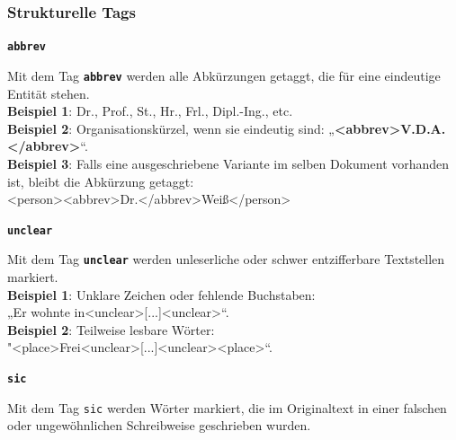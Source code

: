 \documentclass[12pt, a4paper, ngerman, bidi=default]{article}
\begin{document}
    \subsubsection{Strukturelle Tags}
    \begin{description}

    \item \textbf{\colorbox{abbrev}{\texttt{abbrev}}}
        
    Mit dem Tag \texttt{\texttt{\textbf{{\colorbox{abbrev}{abbrev}}}}} werden alle Abkürzungen getaggt, die für eine eindeutige Entität stehen. \\
    
    \noindent\textbf{ Beispiel 1}: Dr., Prof., St., Hr., Frl., Dipl.-Ing., etc.\\
    \textbf{ Beispiel 2}: Organisationskürzel, wenn sie eindeutig sind: „\textbf{\textless abbrev\textgreater V.D.A.\textless /abbrev\textgreater }“.\\
    \textbf{\textbf{ Beispiel 3}}: Falls eine ausgeschriebene Variante im selben Dokument vorhanden ist, bleibt die Abkürzung getaggt:\\
    \colorbox{VeryLightGray}{\textless person\textgreater \textless abbrev\textgreater Dr.\textless /abbrev\textgreater Weiß\textless /person\textgreater}

    
    \item \textbf{\colorbox{unclear}{\texttt{unclear}}}
    

    Mit dem Tag \texttt{\texttt{\textbf{{\colorbox{unclear}{unclear}}}}} werden unleserliche oder schwer entzifferbare Textstellen markiert. \\
    
    \noindent\textbf{ Beispiel 1}: Unklare Zeichen oder fehlende Buchstaben: \\
    \colorbox{VeryLightGray}{„Er wohnte in\textless unclear\textgreater [...]\textless unclear\textgreater“.}\\
    \textbf{ Beispiel 2}: Teilweise lesbare Wörter:\\
    \colorbox{VeryLightGray}{"{\textless place\textgreater Frei\textless unclear\textgreater [...]\textless unclear\textgreater \textless place\textgreater }“.}\\
    
    \item\texttt{\textbf{{\colorbox{sic}{sic}}}} 

    Mit dem Tag \texttt{sic} werden Wörter markiert, die im Originaltext in einer falschen oder ungewöhnlichen Schreibweise geschrieben wurden. \\


\end{description}
\end{document}
